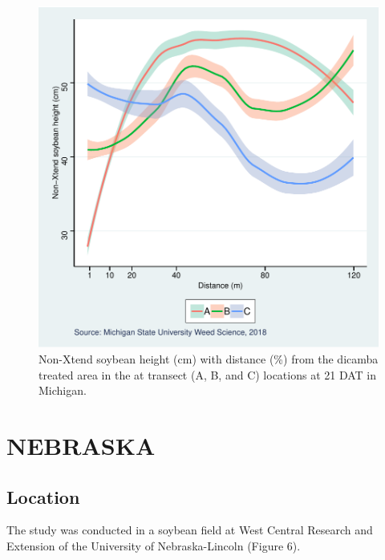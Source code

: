 \documentclass[]{article}
\begin{document}
\begin{figure}
\centering
\includegraphics{Report_Dicamba_study_files/figure-latex/unnamed-chunk-60-1.pdf}
\caption{Non-Xtend soybean height (cm) with distance (\%) from the
dicamba treated area in the at transect (A, B, and C) locations at 21
DAT in Michigan.}
\end{figure}

\newpgae
\pagebreak

\section{NEBRASKA}\label{nebraska-1}

\subsection{Location}\label{location-3}

The study was conducted in a soybean field at West Central Research and
Extension of the University of Nebraska-Lincoln (Figure 6).
\end{document}
